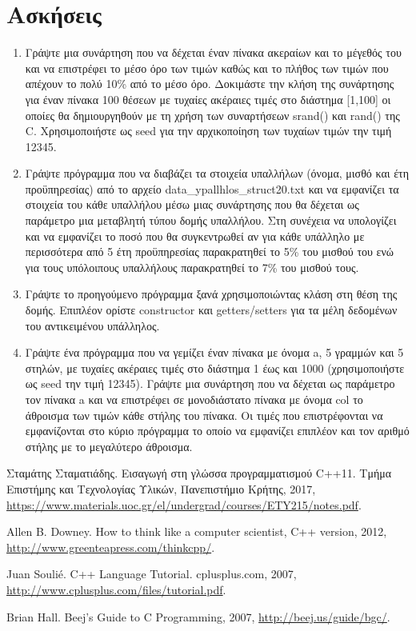 \section{Ασκήσεις}
\begin{enumerate}
\item Γράψτε μια συνάρτηση που να δέχεται έναν πίνακα ακεραίων και το μέγεθός του και να επιστρέφει το μέσο όρο των τιμών καθώς και το πλήθος των τιμών που απέχουν το πολύ 10\% από το μέσο όρο. Δοκιμάστε την κλήση της συνάρτησης για έναν πίνακα 100 θέσεων με τυχαίες ακέραιες τιμές στο διάστημα [1,100] οι οποίες θα δημιουργηθούν με τη χρήση των συναρτήσεων srand() και rand() της C. Χρησιμοποιήστε ως seed για την αρχικοποίηση των τυχαίων τιμών την τιμή 12345.

\item Γράψτε πρόγραμμα που να διαβάζει τα στοιχεία υπαλλήλων (όνομα, μισθό και έτη προϋπηρεσίας) από το αρχείο data\_ypallhlos\_struct20.txt και να εμφανίζει τα στοιχεία του κάθε υπαλλήλου μέσω μιας συνάρτησης που θα δέχεται ως παράμετρο μια μεταβλητή τύπου δομής υπαλλήλου. Στη συνέχεια να υπολογίζει και να εμφανίζει το ποσό που θα συγκεντρωθεί αν για κάθε υπάλληλο με περισσότερα από 5 έτη προϋπηρεσίας παρακρατηθεί το 5\% του μισθού του ενώ για τους υπόλοιπους υπαλλήλους παρακρατηθεί το 7\% του μισθού τους.

\item Γράψτε το προηγούμενο πρόγραμμα ξανά χρησιμοποιώντας κλάση στη θέση της δομής. Επιπλέον ορίστε constructor και getters/setters για τα μέλη δεδομένων του αντικειμένου υπάλληλος.

\item Γράψτε ένα πρόγραμμα που να γεμίζει έναν πίνακα με όνομα a, 5 γραμμών και 5 στηλών, με τυχαίες ακέραιες τιμές στο διάστημα 1 έως και 1000 (χρησιμοποιήστε ως seed την τιμή 12345). Γράψτε μια συνάρτηση που να δέχεται ως παράμετρο τον πίνακα a και να επιστρέφει σε μονοδιάστατο πίνακα με όνομα col το άθροισμα των τιμών κάθε στήλης του πίνακα. Οι τιμές που επιστρέφονται να εμφανίζονται στο κύριο πρόγραμμα το οποίο να εμφανίζει επιπλέον και τον αριθμό στήλης με το μεγαλύτερο άθροισμα.
\end{enumerate}



\begin{thebibliography}{9}
Σταμάτης Σταματιάδης. Εισαγωγή στη γλώσσα προγραμματισμού C++11. Τμήμα Επιστήμης και Τεχνολογίας Υλικών, Πανεπιστήμιο Κρήτης, 2017, \href{https://www.materials.uoc.gr/el/undergrad/courses/ETY215/notes.pdf}{https://www.materials.uoc.gr/el/undergrad/courses/ETY215/notes.pdf}.

Allen B. Downey. How to think like a computer scientist, C++ version, 2012, \href{http://www.greenteapress.com/thinkcpp/}{http://www.greenteapress.com/thinkcpp/}. 

Juan Souli\'e. C++ Language Tutorial. cplusplus.com, 2007, \href{http://www.cplusplus.com/files/tutorial.pdf}{http://www.cplusplus.com/files/tutorial.pdf}.

Brian Hall. Beej's Guide to C Programming, 2007, \href{http://beej.us/guide/bgc/}{http://beej.us/guide/bgc/}.

\end{thebibliography}
